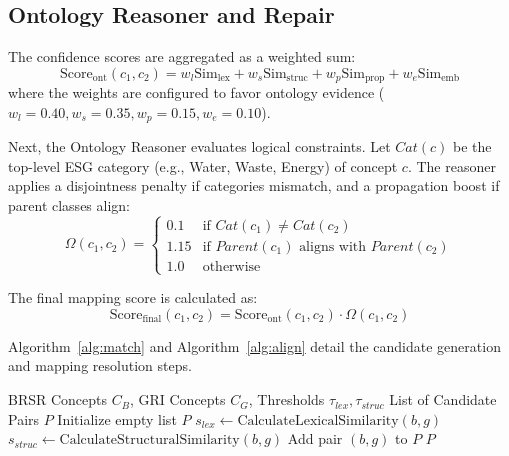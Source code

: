 \documentclass[journal,compsoc]{IEEEtran}
\begin{document}
\subsection{Ontology Reasoner and Repair}
The confidence scores are aggregated as a weighted sum:
\begin{equation}
\text{Score}_{\text{ont}}(c_1, c_2) = w_{l}\text{Sim}_{\text{lex}} + w_{s}\text{Sim}_{\text{struc}} + w_{p}\text{Sim}_{\text{prop}} + w_{e}\text{Sim}_{\text{emb}}
\label{eq:weighted}
\end{equation}
where the weights are configured to favor ontology evidence ($w_l = 0.40, w_s = 0.35, w_p = 0.15, w_e = 0.10$).

Next, the Ontology Reasoner evaluates logical constraints. Let $Cat(c)$ be the top-level ESG category (e.g., Water, Waste, Energy) of concept $c$. The reasoner applies a disjointness penalty if categories mismatch, and a propagation boost if parent classes align:
\begin{equation}
\Omega(c_1, c_2) = 
\begin{cases} 
0.1 & \text{if } Cat(c_1) \neq Cat(c_2) \\
1.15 & \text{if } Parent(c_1) \text{ aligns with } Parent(c_2) \\
1.0 & \text{otherwise}
\end{cases}
\end{equation}

The final mapping score is calculated as:
\begin{equation}
\text{Score}_{\text{final}}(c_1, c_2) = \text{Score}_{\text{ont}}(c_1, c_2) \cdot \Omega(c_1, c_2)
\label{eq:final}
\end{equation}

Algorithm~\ref{alg:match} and Algorithm~\ref{alg:align} detail the candidate generation and mapping resolution steps.

\begin{algorithm}
\caption{Ontology-Guided Candidate Generation}
\label{alg:match}
\begin{algorithmic}[1]
\REQUIRE BRSR Concepts $C_B$, GRI Concepts $C_G$, Thresholds $\tau_{lex}, \tau_{struc}$
\ENSURE List of Candidate Pairs $P$
\STATE Initialize empty list $P$
        \STATE $s_{lex} \leftarrow \text{CalculateLexicalSimilarity}(b, g)$
        \STATE $s_{struc} \leftarrow \text{CalculateStructuralSimilarity}(b, g)$
            \STATE Add pair $(b, g)$ to $P$
        \ENDIF
    \ENDFOR
\ENDFOR
\RETURN $P$
\end{algorithmic}
\end{algorithm}
\end{document}
